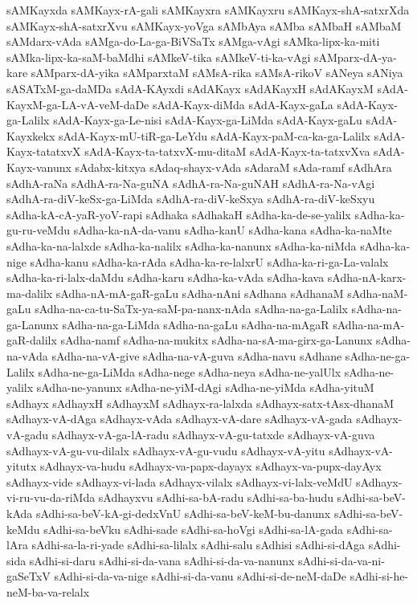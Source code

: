 {sAMKayxda
sAMKayx-rA-gali
sAMKayxra
sAMKayxru
sAMKayx-shA-satxrXda
sAMKayx-shA-satxrXvu
sAMKayx-yoVga
sAMbAya
sAMba
sAMbaH
sAMbaM
sAMdarx-vAda
sAMga-do-La-ga-BiVSaTx
sAMga-vAgi
sAMka-lipx-ka-miti
sAMka-lipx-ka-saM-baMdhi
sAMkeV-tika
sAMkeV-ti-ka-vAgi
sAMparx-dA-ya-kare
sAMparx-dA-yika
sAMparxtaM
sAMsA-rika
sAMsA-rikoV
sANeya
sANiya
sASATxM-ga-daMDa
sAdA-KAyxdi
sAdAKayx
sAdAKayxH
sAdAKayxM
sAdA-KayxM-ga-LA-vA-veM-daDe
sAdA-Kayx-diMda
sAdA-Kayx-gaLa
sAdA-Kayx-ga-Lalilx
sAdA-Kayx-ga-Le-nisi
sAdA-Kayx-ga-LiMda
sAdA-Kayx-gaLu
sAdA-Kayxkekx
sAdA-Kayx-mU-tiR-ga-LeYdu
sAdA-Kayx-paM-ca-ka-ga-Lalilx
sAdA-Kayx-tatatxvX
sAdA-Kayx-ta-tatxvX-mu-ditaM
sAdA-Kayx-ta-tatxvXva
sAdA-Kayx-vanunx
sAdabx-kitxya
sAdaq-shayx-vAda
sAdaraM
sAda-ramf
sAdhAra
sAdhA-raNa
sAdhA-ra-Na-guNA
sAdhA-ra-Na-guNAH
sAdhA-ra-Na-vAgi
sAdhA-ra-diV-keSx-ga-LiMda
sAdhA-ra-diV-keSxya
sAdhA-ra-diV-keSxyu
sAdha-kA-cA-yaR-yoV-rapi
sAdhaka
sAdhakaH
sAdha-ka-de-se-yalilx
sAdha-ka-gu-ru-veMdu
sAdha-ka-nA-da-vanu
sAdha-kanU
sAdha-kana
sAdha-ka-naMte
sAdha-ka-na-lalxde
sAdha-ka-nalilx
sAdha-ka-nanunx
sAdha-ka-niMda
sAdha-ka-nige
sAdha-kanu
sAdha-ka-rAda
sAdha-ka-re-lalxrU
sAdha-ka-ri-ga-La-valalx
sAdha-ka-ri-lalx-daMdu
sAdha-karu
sAdha-ka-vAda
sAdha-kava
sAdha-nA-karx-ma-dalilx
sAdha-nA-mA-gaR-gaLu
sAdha-nAni
sAdhana
sAdhanaM
sAdha-naM-gaLu
sAdha-na-ca-tu-SaTx-ya-saM-pa-nanx-nAda
sAdha-na-ga-Lalilx
sAdha-na-ga-Lanunx
sAdha-na-ga-LiMda
sAdha-na-gaLu
sAdha-na-mAgaR
sAdha-na-mA-gaR-dalilx
sAdha-namf
sAdha-na-mukitx
sAdha-na-sA-ma-girx-ga-Lanunx
sAdha-na-vAda
sAdha-na-vA-give
sAdha-na-vA-guva
sAdha-navu
sAdhane
sAdha-ne-ga-Lalilx
sAdha-ne-ga-LiMda
sAdha-nege
sAdha-neya
sAdha-ne-yalUlx
sAdha-ne-yalilx
sAdha-ne-yanunx
sAdha-ne-yiM-dAgi
sAdha-ne-yiMda
sAdha-yituM
sAdhayx
sAdhayxH
sAdhayxM
sAdhayx-ra-lalxda
sAdhayx-satx-tAsx-dhanaM
sAdhayx-vA-dAga
sAdhayx-vAda
sAdhayx-vA-dare
sAdhayx-vA-gada
sAdhayx-vA-gadu
sAdhayx-vA-ga-lA-radu
sAdhayx-vA-gu-tatxde
sAdhayx-vA-guva
sAdhayx-vA-gu-vu-dilalx
sAdhayx-vA-gu-vudu
sAdhayx-vA-yitu
sAdhayx-vA-yitutx
sAdhayx-va-hudu
sAdhayx-va-papx-dayayx
sAdhayx-va-pupx-dayAyx
sAdhayx-vide
sAdhayx-vi-lada
sAdhayx-vilalx
sAdhayx-vi-lalx-veMdU
sAdhayx-vi-ru-vu-da-riMda
sAdhayxvu
sAdhi-sa-bA-radu
sAdhi-sa-ba-hudu
sAdhi-sa-beV-kAda
sAdhi-sa-beV-kA-gi-dedxVnU
sAdhi-sa-beV-keM-bu-danunx
sAdhi-sa-beV-keMdu
sAdhi-sa-beVku
sAdhi-sade
sAdhi-sa-hoVgi
sAdhi-sa-lA-gada
sAdhi-sa-lAra
sAdhi-sa-la-ri-yade
sAdhi-sa-lilalx
sAdhi-salu
sAdhisi
sAdhi-si-dAga
sAdhi-sida
sAdhi-si-daru
sAdhi-si-da-vana
sAdhi-si-da-va-nanunx
sAdhi-si-da-va-ni-gaSeTxV
sAdhi-si-da-va-nige
sAdhi-si-da-vanu
sAdhi-si-de-neM-daDe
sAdhi-si-he-neM-ba-va-relalx
}

